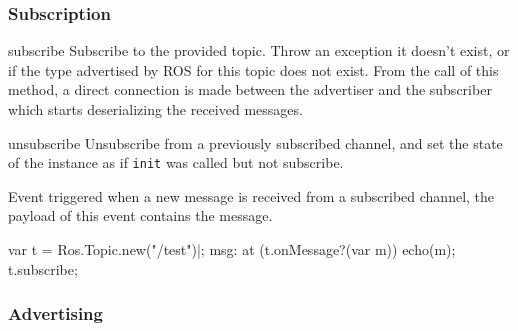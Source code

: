 \subsubsection{Subscription}

\begin{urbiscriptapi}

\item[subscribe]%
  Subscribe to the provided topic. Throw an exception it doesn't exist, or
  if the type advertised by ROS for this topic does not exist.  From the
  call of this method, a direct connection is made between the advertiser
  and the subscriber which starts deserializing the received messages.

\item[unsubscribe]%
  Unsubscribe from a previously subscribed channel, and set the state of the
  instance as if \lstinline{init} was called but not subscribe.

\item[onMessage]%
  Event triggered when a new message is received from a subscribed channel,
  the payload of this event contains the message.

\begin{urbiunchecked}
var t = Ros.Topic.new("/test")|;
msg: at (t.onMessage?(var m)) echo(m);
t.subscribe;
\end{urbiunchecked}
\end{urbiscriptapi}


\subsubsection{Advertising}

